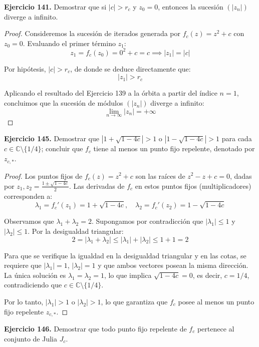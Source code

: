\documentclass[11pt,a4paper]{article}
\theoremstyle{definition}
\theoremstyle{plain}
\theoremstyle{remark}
\begin{document}
	\noindent\textbf{Ejercicio 141.} Demostrar que si $|c| > r_c$ y $z_0 = 0$, entonces la sucesión $(|z_n|)$ diverge a infinito.
	
	\begin{proof}
		Consideremos la sucesión de iterados generada por $f_c(z) = z^2 + c$ con $z_0 = 0$. Evaluando el primer término $z_1$:
		\[ z_1 = f_c(z_0) = 0^2 + c = c \implies |z_1| = |c| \]
		
		Por hipótesis, $|c| > r_c$, de donde se deduce directamente que:
		\[ |z_1| > r_c \]
		
		Aplicando el resultado del Ejercicio 139 a la órbita a partir del índice $n = 1$, concluimos que la sucesión de módulos $(|z_n|)$ diverge a infinito:
		\[ \lim_{n \to \infty} |z_n| = +\infty \]
	\end{proof}	
	
	\noindent\textbf{Ejercicio 145.} Demostrar que $|1 + \sqrt{1 - 4c}| > 1$ o $|1 - \sqrt{1 - 4c}| > 1$ para cada $c \in \mathbb{C} \setminus \{1/4\}$; concluir que $f_c$ tiene al menos un punto fijo repelente, denotado por $z_{c,*}$.
	
	\begin{proof}
		Los puntos fijos de $f_c(z) = z^2 + c$ son las raíces de $z^2 - z + c = 0$, dadas por $z_1, z_2 = \frac{1 \pm \sqrt{1 - 4c}}{2}$. Las derivadas de $f_c$ en estos puntos fijos (multiplicadores) corresponden a:
		\[ \lambda_1 = f_c'(z_1) = 1 + \sqrt{1 - 4c}, \quad \lambda_2 = f_c'(z_2) = 1 - \sqrt{1 - 4c} \]
		
		Observamos que $\lambda_1 + \lambda_2 = 2$. Supongamos por contradicción que $|\lambda_1| \le 1$ y $|\lambda_2| \le 1$. Por la desigualdad triangular:
		\[ 2 = |\lambda_1 + \lambda_2| \le |\lambda_1| + |\lambda_2| \le 1 + 1 = 2 \]
		
		Para que se verifique la igualdad en la desigualdad triangular y en las cotas, se requiere que $|\lambda_1| = 1$, $|\lambda_2| = 1$ y que ambos vectores posean la misma dirección. La única solución es $\lambda_1 = \lambda_2 = 1$, lo que implica $\sqrt{1 - 4c} = 0$, es decir, $c = 1/4$, contradiciendo que $c \in \mathbb{C} \setminus \{1/4\}$.
		
		Por lo tanto, $|\lambda_1| > 1$ o $|\lambda_2| > 1$, lo que garantiza que $f_c$ posee al menos un punto fijo repelente $z_{c,*}$.
	\end{proof}
	
	\noindent\textbf{Ejercicio 146.} Demostrar que todo punto fijo repelente de $f_c$ pertenece al conjunto de Julia $J_c$.
	
\end{document}
